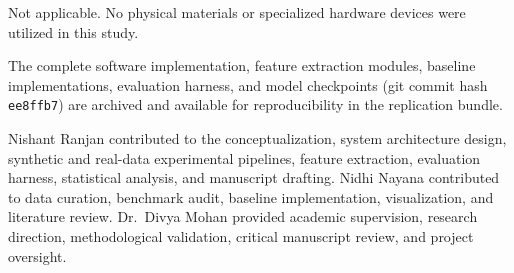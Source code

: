 \documentclass[pdflatex,sn-mathphys,Numbered]{sn-jnl}
\begin{document}
Not applicable. No physical materials or specialized hardware devices were utilized in this study.

The complete software implementation, feature extraction modules, baseline implementations, evaluation harness, and model checkpoints (git commit hash \texttt{ee8ffb7}) are archived and available for reproducibility in the replication bundle.

Nishant Ranjan contributed to the conceptualization, system architecture design, synthetic and real-data experimental pipelines, feature extraction, evaluation harness, statistical analysis, and manuscript drafting. Nidhi Nayana contributed to data curation, benchmark audit, baseline implementation, visualization, and literature review. Dr.~Divya Mohan provided academic supervision, research direction, methodological validation, critical manuscript review, and project oversight.


\end{document}
